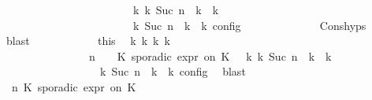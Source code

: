 \begin{isabellebody}
\ \ \ \ \ \ \ \ \ \ \ \ \ \ \ \ \ \ \ \ \ \ \ \ {\isasymhookrightarrow}\isactrlbsup k\isactrlesup \ {\isacharparenleft}{\isasymGamma}\isactrlsub k{\isacharcomma}\ Suc\ n\ {\isasymturnstile}\ {\isasymPsi}\isactrlsub k\ {\isasymtriangleright}\ {\isasymPhi}\isactrlsub k{\isacharparenright}{\isacharparenright}\isanewline
\ \ \ \ \ \ \ \ \ \ \ \ \ \ \ \ \ \ \ \ {\isasymand}\ {\isasymrho}\ {\isasymin}\ {\isasymlbrakk}\ {\isasymGamma}\isactrlsub k{\isacharcomma}\ Suc\ n\ {\isasymturnstile}\ {\isasymPsi}\isactrlsub k\ {\isasymtriangleright}\ {\isasymPhi}\isactrlsub k\ {\isasymrbrakk}\isactrlsub c\isactrlsub o\isactrlsub n\isactrlsub f\isactrlsub i\isactrlsub g{\isacartoucheclose}\isanewline
\ \ \ \ \ \ \ \ \ \ \ \ \isamarkupfalse%
\ Cons{\isachardot}hyps\ \isamarkupfalse%
\ blast\isanewline
\ \ \ \ \ \ \ \ \ \ \isamarkupfalse%
\ this\ \isamarkupfalse%
\ {\isasymGamma}\isactrlsub k\ {\isasymPsi}\isactrlsub k\ {\isasymPhi}\isactrlsub k\ k\ \isanewline
\ \ \ \ \ \ \ \ \ \ \ \ \ \ \ {\isacartoucheopen}{\isacharparenleft}{\isacharparenleft}{\isasymGamma}{\isacharcomma}\ n\ {\isasymturnstile}\ {\isasymPsi}\ {\isasymtriangleright}\ {\isacharparenleft}{\isacharparenleft}K\ sporadic{\isasymsharp}\ {\isasymtau}\isactrlsub e\isactrlsub x\isactrlsub p\isactrlsub r\ on\ K\ {\isacharhash}\ {\isasymPhi}{\isacharparenright}{\isacharparenright}\ {\isasymhookrightarrow}\isactrlbsup k\isactrlesup \ {\isacharparenleft}{\isasymGamma}\isactrlsub k{\isacharcomma}\ Suc\ n\ {\isasymturnstile}\ {\isasymPsi}\isactrlsub k\ {\isasymtriangleright}\ {\isasymPhi}\isactrlsub k{\isacharparenright}{\isacharparenright}{\isacartoucheclose}\isanewline
\ \ \ \ \ \ \ \ \ \ \ \ \ \ \ {\isacharasterisk}{\isacharcolon}{\isacartoucheopen}{\isasymrho}\ {\isasymin}\ {\isasymlbrakk}\ {\isasymGamma}\isactrlsub k{\isacharcomma}\ Suc\ n\ {\isasymturnstile}\ {\isasymPsi}\isactrlsub k\ {\isasymtriangleright}\ {\isasymPhi}\isactrlsub k\ {\isasymrbrakk}\isactrlsub c\isactrlsub o\isactrlsub n\isactrlsub f\isactrlsub i\isactrlsub g{\isacartoucheclose}\ \isamarkupfalse%
\ blast\isanewline
\ \ \ \ \ \ \ \ \ \ \isamarkupfalse%
\ \isamarkupfalse%
\ {\isacartoucheopen}{\isacharparenleft}{\isasymGamma}{\isacharcomma}\ n\ {\isasymturnstile}{\isacharparenleft}{\isacharparenleft}K\ sporadic{\isasymsharp}\ {\isasymtau}\isactrlsub e\isactrlsub x\isactrlsub p\isactrlsub r\ on\ K\ {\isacharhash}\ {\isasymPsi}{\isacharparenright}\ {\isasymtriangleright}\ {\isasymPhi}{\isacharparenright}\isanewline

\end{isabellebody}
